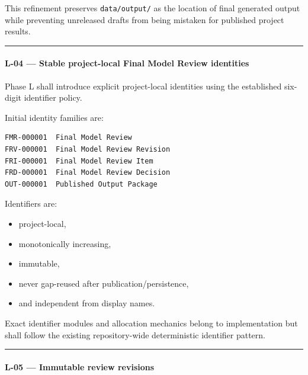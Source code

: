 This refinement preserves \texttt{data/output/} as the location of final generated output while preventing unreleased drafts from being mistaken for published project results.

\begin{center}\rule{0.5\linewidth}{0.5pt}\end{center}

\hypertarget{l-04--stable-project-local-final-model-review-identities}{%
\paragraph{L-04 --- Stable project-local Final Model Review identities}\label{l-04--stable-project-local-final-model-review-identities}}

Phase L shall introduce explicit project-local identities using the established six-digit identifier policy.

Initial identity families are:

\begin{verbatim}
FMR-000001  Final Model Review
FRV-000001  Final Model Review Revision
FRI-000001  Final Model Review Item
FRD-000001  Final Model Review Decision
OUT-000001  Published Output Package
\end{verbatim}

Identifiers are:

\begin{itemize}
\tightlist
\item
  project-local,
\item
  monotonically increasing,
\item
  immutable,
\item
  never gap-reused after publication/persistence,
\item
  and independent from display names.
\end{itemize}

Exact identifier modules and allocation mechanics belong to implementation but shall follow the existing repository-wide deterministic identifier pattern.

\begin{center}\rule{0.5\linewidth}{0.5pt}\end{center}

\hypertarget{l-05--immutable-review-revisions}{%
\paragraph{L-05 --- Immutable review revisions}\label{l-05--immutable-review-revisions}}

